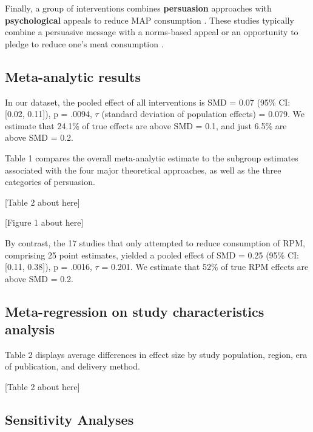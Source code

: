 \documentclass[sn-nature,referee,pdflatex]{sn-jnl}
\begin{document}
Finally, a group of interventions combines \textbf{persuasion}
approaches with \textbf{psychological} appeals to reduce MAP consumption
\citep{berndsen2005, bertolaso2015, carfora2023, fehrenbach2015, hennessy2016, mathur2021effectiveness, mattson2020, piester2020, shreedhar2021}.
These studies typically combine a persuasive message with a norms-based
appeal \citep{piester2020, mattson2020} or an opportunity to pledge to
reduce one's meat consumption
\citep{mathur2021effectiveness, shreedhar2021}.

\subsection{Meta-analytic results}\label{sec2.3}

In our dataset, the pooled effect of all interventions is SMD = 0.07
(95\% CI: {[}0.02, 0.11{]}), p = .0094, \(\tau\) (standard deviation of
population effects) = 0.079. We estimate that 24.1\% of true effects are
above SMD = 0.1, and just 6.5\% are above SMD = 0.2.

Table 1 compares the overall meta-analytic estimate to the subgroup
estimates associated with the four major theoretical approaches, as well
as the three categories of persuasion.

\begin{center}
[Table 2 about here]
\end{center}
\begin{center}
[Figure 1 about here]
\end{center}

By contrast, the 17 studies that only attempted to reduce consumption of
RPM, comprising 25 point estimates, yielded a pooled effect of SMD =
0.25 (95\% CI: {[}0.11, 0.38{]}), p = .0016, \(\tau\) = 0.201. We
estimate that 52\% of true RPM effects are above SMD = 0.2.

\subsection{Meta-regression on study characteristics
analysis}\label{sec2.4}

Table 2 displays average differences in effect size by study population,
region, era of publication, and delivery method.

\begin{center}
[Table 2 about here]
\end{center}

\subsection{Sensitivity Analyses}\label{sec2.5}
\end{document}
